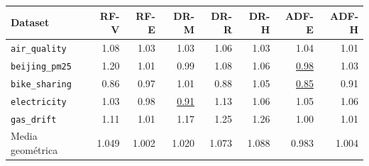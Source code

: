 \begin{tabular*}{\textwidth}{@{\extracolsep{\fill}} l rrrrrrr}
\toprule
Dataset & {RF-V} & {RF-E} & {DR-M} & {DR-R} & {DR-H} & {ADF-E} & {ADF-H} \\
\midrule
\texttt{air\_quality} & 1.08 & 1.03 & 1.03 & 1.06 & 1.03 & 1.04 & 1.01 \\
\texttt{beijing\_pm25} & 1.20 & 1.01 & 0.99 & 1.08 & 1.06 & \underline{0.98} & 1.03 \\
\texttt{bike\_sharing} & 0.86 & 0.97 & 1.01 & 0.88 & 1.05 & \underline{0.85} & 0.91 \\
\texttt{electricity} & 1.03 & 0.98 & \underline{0.91} & 1.13 & 1.06 & 1.05 & 1.06 \\
\texttt{gas\_drift} & 1.11 & 1.01 & 1.17 & 1.25 & 1.26 & 1.00 & 1.01 \\
\midrule
Media geométrica & 1.049 & 1.002 & 1.020 & 1.073 & 1.088 & 0.983 & 1.004 \\
\bottomrule
\end{tabular*}
